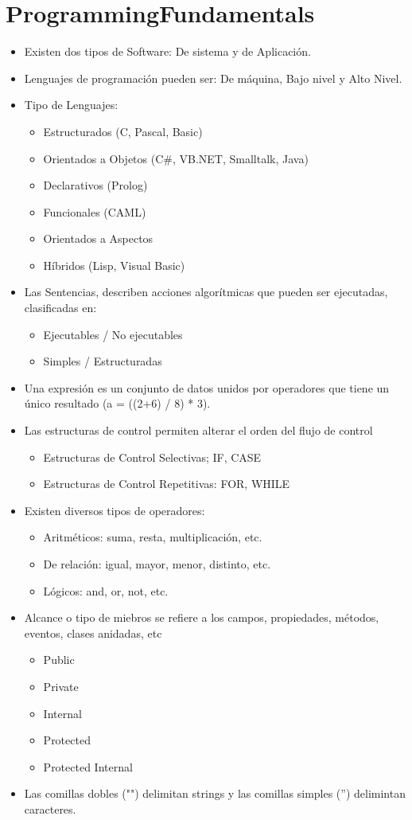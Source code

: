 \section{ProgrammingFundamentals}


\begin{itemize}
\item Existen dos tipos de Software: De sistema y de Aplicación.
\item Lenguajes de programación pueden ser: De máquina, Bajo nivel y Alto Nivel.
\item Tipo de Lenguajes:
	\begin{itemize}
		\item Estructurados (C, Pascal, Basic)
		\item Orientados a Objetos (C\#, VB.NET, Smalltalk, Java)
		\item Declarativos (Prolog)
		\item Funcionales (CAML)
		\item Orientados a Aspectos
		\item Híbridos (Lisp, Visual Basic)
	\end{itemize}
\item Las Sentencias, describen acciones algorítmicas que pueden ser ejecutadas, clasificadas en:
	\begin{itemize}
		\item Ejecutables / No ejecutables
		\item Simples / Estructuradas
	\end{itemize}
\item Una expresión es un conjunto de datos unidos por operadores que tiene un único resultado (a = ((2+6) / 8) * 3).
\item Las estructuras de control permiten alterar el orden del flujo de control
	\begin{itemize}
		\item Estructuras de Control Selectivas; IF, CASE
		\item Estructuras de Control Repetitivas: FOR, WHILE
	\end{itemize}
\item Existen diversos tipos de operadores:
	\begin{itemize}
		\item Aritméticos: suma, resta, multiplicación, etc.
		\item De relación: igual, mayor, menor, distinto, etc.
		\item Lógicos: and, or, not, etc.
	\end{itemize}
\item Alcance o tipo de miebros se refiere a los campos, propiedades, métodos, eventos, clases anidadas, etc
	\begin{itemize}
		\item Public
		\item Private
		\item Internal
		\item Protected
		\item Protected Internal
	\end{itemize}
\item Las comillas dobles ("") delimitan strings y las comillas simples ('') delimintan caracteres.
\end{itemize}

